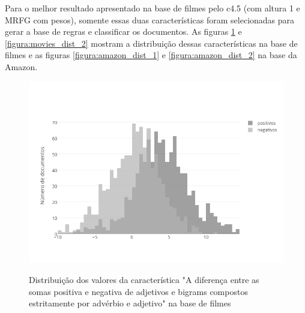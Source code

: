 \documentclass[template.tex]{subfiles}
\begin{document}
Para o melhor resultado apresentado na base de filmes pelo c4.5 (com altura 1 e MRFG com pesos),
  somente essas duas características foram selecionadas para gerar a base de regras e classificar os documentos. As figuras \ref{figura:movies_dist_1} e \ref{figura:movies_dist_2} mostram a distribuição dessas características na base de filmes e as figuras \ref{figura:amazon_dist_1} e \ref{figura:amazon_dist_2} na base da Amazon. 


\begin{figure}[phtb]
\caption{Distribuição dos valores da característica "A diferença entre as somas positiva e negativa de adjetivos e bigrams compostos estritamente por advérbio e adjetivo" na base de filmes}
\centering
\includegraphics[scale=0.70]{movies_positive_to_negative_ratio_of_adjectives_sum_and_bigrams_with_adjectives}
\label{figura:movies_dist_1}
\end{figure}
\end{document}
